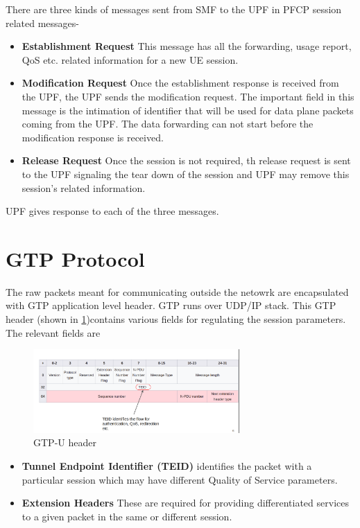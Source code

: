 There are three kinds of messages sent from SMF to the UPF in PFCP session related messages-
\begin{itemize}
	\item \textbf{Establishment Request} This message has all the forwarding, usage report, QoS etc. related information for  a new UE session.  
	\item \textbf{Modification Request} Once the establishment response is
	received from the UPF, the UPF sends the modification request. The important field in this message is the intimation of identifier that will be used for data plane packets coming from the UPF. The data forwarding can not start before the modification response is received.
	\item \textbf{Release Request} Once the session is not required, th release 
	request is sent to the UPF signaling the tear down of the session and UPF
	 may remove this session's related information.
\end{itemize}
UPF gives response to each of the three messages. 
\section {GTP Protocol\label{secGTP}}
The raw packets meant for communicating outside the netowrk are encapsulated with GTP  application level 
header. GTP runs over UDP/IP stack. This GTP header  (shown in \ref{figGTPheader})contains various fields for regulating the
 session parameters. The relevant fields are
 \begin{figure}[htbp]
    \centering
    \includegraphics[width=0.7\textwidth, keepaspectratio]{./fig/Introduction/intro2.png}
    \caption{GTP-U header \cite{gtpwiki}}
    \label{figGTPheader}
\end{figure}
 \begin{itemize}
    \item \textbf{Tunnel Endpoint Identifier (TEID)} identifies the packet with a particular session which may have different Quality of Service parameters.
    \item \textbf{Extension Headers} These are required for providing differentiated services to  a given packet in the same or different session.
 \end{itemize}

